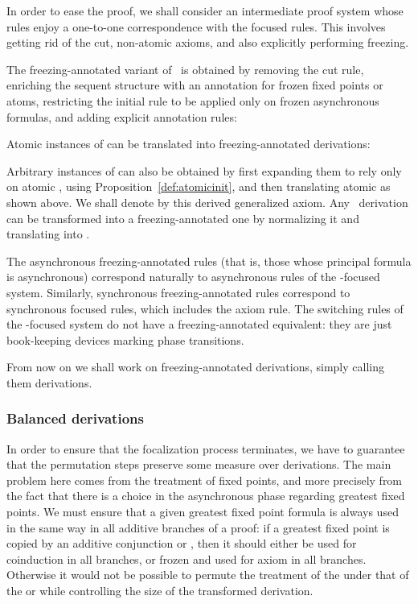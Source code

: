 In order to ease the proof, we shall consider an intermediate
proof system whose rules enjoy a one-to-one correspondence with
the focused rules.
This involves getting rid of the cut, non-atomic axioms,
and also explicitly performing freezing.

\begin{definition}
The freezing-annotated variant of \mumall\ is obtained by
removing the cut rule,
enriching the sequent structure with an annotation for frozen fixed points
or atoms,
restricting the initial rule to be applied only on frozen asynchronous
formulas,
and adding explicit annotation rules:


Atomic instances of  can be translated into freezing-annotated
derivations:

Arbitrary instances of  can also be obtained by first expanding them
to rely only on atomic , using Proposition~\ref{def:atomicinit},
and then translating atomic  as shown above.
We shall denote by  this derived generalized axiom.
Any \mumall\ derivation can be transformed into a freezing-annotated one
by normalizing it and translating  into .
\end{definition}

The asynchronous freezing-annotated rules (that is,
those whose principal formula is asynchronous) correspond naturally
to asynchronous rules of the -focused system.
Similarly, synchronous freezing-annotated rules correspond to
synchronous focused rules, which includes the axiom rule.
The switching rules of the -focused system
do not have a freezing-annotated equivalent:
they are just book-keeping devices marking phase transitions.

From now on we shall work on freezing-annotated derivations,
simply calling them derivations.


\subsubsection{Balanced derivations}

In order to ensure that the focalization process terminates, we have to 
guarantee that the permutation steps preserve some measure over derivations.
The main problem here comes from the treatment of fixed points,
and more precisely from the fact that there is a choice in the asynchronous
phase regarding greatest fixed points.
We must ensure that a given greatest fixed point formula is always used in 
the same way in all additive branches of a proof:
if a greatest fixed point is copied by an additive conjunction or ,
then it should either be used for coinduction in all branches,
or frozen and used for axiom in all branches.
Otherwise it would not be possible to permute the treatment of the 
 under that of the  or  while controlling the size of
the transformed derivation.

